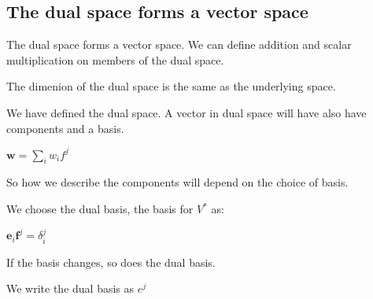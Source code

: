 
\subsection{The dual space forms a vector space}

The dual space forms a vector space. We can define addition and scalar multiplication on members of the dual space.

The dimenion of the dual space is the same as the underlying space.

We have defined the dual space. A vector in dual space will have also have components and a basis.

\(\mathbf w=\sum_i w_i f^j\)

So how we describe the components will depend on the choice of basis.

We choose the dual basis, the basis for \(V^*\) as:

\(\mathbf e_i \mathbf f^j =\delta_i^j\)

If the basis changes, so does the dual basis.

We write the dual basis as \(e^j\)

